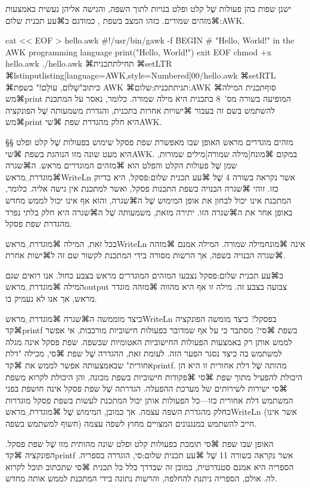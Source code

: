 ישנן שפות בהן פעולות שֶׁל קלט ופלט בנויות לתוך השפה, והגישה אליהן נעשית באמצעות
⌘מזהים שמורים. כזהו המצב בשפת \AWK, כמודגם ב⌘עע תכנית שלום:AWK.

\bash
cat << EOF > hello.awk
#!/usr/bin/gawk -f
BEGIN { # "Hello, World!" in the AWK programming language
  print("Hello, World!")
  exit
}
EOF
chmod +x hello.awk
./hello.awk
\END
⌘תחילת{תכנית}
⌘setLTR
⌘lstinputlisting[language=AWK,style=Numbered]{00/hello.awk}
⌘setRTL
⌘כיתוב{"שָׁלוֹם, עוֹלָם!" בשפת AWK}
⌘תגית{תכנית:שלום:AWK}
⌘סוף{תכנית}
המילה ⌘מש{print} המופיעה בשורה מס'~8 בתכנית היא מילה שמורה. כלומר, נאסר על
המתכנת להשתמש בשם זה בעבור ⌘ישויות אחרות בתכנית, והגדרת משמעותה שֶׁל הפונקציה
⌘מש{print} היא חלק מהגדרת שפת ⌘שי{AWK}.

§§ מזהים מוגדרים מראש
האופן שבו מאפשרת שפת פסקל שימוש בפעולות שֶׁל קלט ופלט היא מעט שונה מזו הנוהגת
בשפת ⌘שי{AWK}. במקום ⌘מונח[מילה שמורה]{מילים שמורות}, שמן שֶׁל פעולות הקלט והפלט
הוא ⌘מזהים המוגדרים מראש. ה⌘שגרה ⌘מוגדרת␣מראש{WriteLn} אשר נקראה בשורה 4 שֶׁל
⌘עע תכנית שלום:פסקל, היא בדיוק כזו. זוהי ⌘שגרה הבנויה בשפת התכנות פסקל, ואשר
למתכנת אין גישה אליה. כלומר, המתכנת אינו יכול לבחון את אופן המימוש שֶׁל ה⌘שגרה,
והוא אף אינו יכול לממש מחדש באופן אחר את ה⌘שגרה הזו. יתירה מזאת, משמעותה שֶׁל
ה⌘שגרה היא חלק בלתי נפרד מהגדרת שפת פסקל.

בכל זאת, המילה ⌘מוגדרת␣מראש{WriteLn} אינה ⌘מונח{מילה שמורה}. המילה אמנם ⌘מזהה
⌘שגרה הבנויה בשפה, אך הרשות מסורה בידי המתכנת לקשור שם זה ל⌘ישות אחרת.

ב⌘עע תכנית שלום:פסקל נצבעו המזהים המוגדרים מראש בצבע כחול. אנו רואים שגם המילה
⌘מוגדרת␣מראש{output} צבועה בצבע זה. מילה זו אף היא מהווה ⌘מזהה מוגדר מראש, אך
אנו לא נעמיק בו.

כיצד מוממשה ה⌘שגרה{} ⌘מוגדרת␣מראש{WriteLn} בפסקל? כיצד מומשה הפונקציה
⌘קד{printf} בשפת ⌘סי? מסתבר כי על אף שמדובר בפעולות חישוביות מורכבות, אי אפשר
    לממש אותן רק באמצעות הפעולות החישוביות האטומיות שבשפה. שפת פסקל אינה מגלה
    למשתמש בה כיצד נסגר הפער הזה. לעומת זאת, ההגדרה שֶׁל שפת ⌘סי, מכילה "דלת אחורית"
    שבאמצעותה אפשר לממש את ⌘קד{printf}. מהותה שֶׁל דלת אחורית זו היא הן היכולת להפעיל
    מתוך שפת ⌘סי ⌘פקודות חישוביות בשפת מכונה, והן היכולת לקרוא משפת ⌘סי ישירות
    לשירותים של מערכת ההפעלה. הגדרתה שֶׁל שפת פסקל אינה חושפת בפני
    המשתמש דלת אחורית כזו---כל הפעולות אותן יכול המתכנת לעשות בשפת פסקל
    מוגדרות כחלק מהגדרת השפה עצמה. אך כמובן, המימוש שֶׁל ⌘מוגדרת␣מראש{WriteLn} (אשר אינו
    חשוף למשתמש בשפה) חייב להשתמש במנגנונים המצויים מחוץ לשפה עצמה.

    האופן שבו שפת ⌘סי תומכת בפעולות קלט ופלט שונה מהותית מזו שֶׁל שפת פסקל. הפונקציה
    ⌘קד{printf} אשר נקראה בשורה 11 שֶׁל ⌘עע תכנית שלום:סי, הוגדרה בספריה. הספריה היא
    אמנם סטנדרטית, במובן זה שבדרך כלל כל תכנית ⌘סי שתכתוב תוכל לקרוא לה. אולם,
    הספריה ניתנת להחלפה, והרשות נתונה בידי המתכנת לממש אותה מחדש.

